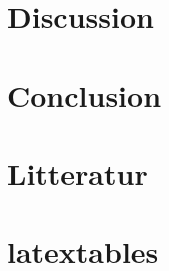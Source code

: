 \documentclass{article}
\begin{document}
	\section{Discussion}
	
	\newpage
	
	\section{Conclusion}
	
	\newpage
	
 	\section{Litteratur}
 	
 	\section{latextables}
 	\newpage
 	
 	
 	
\end{document}
